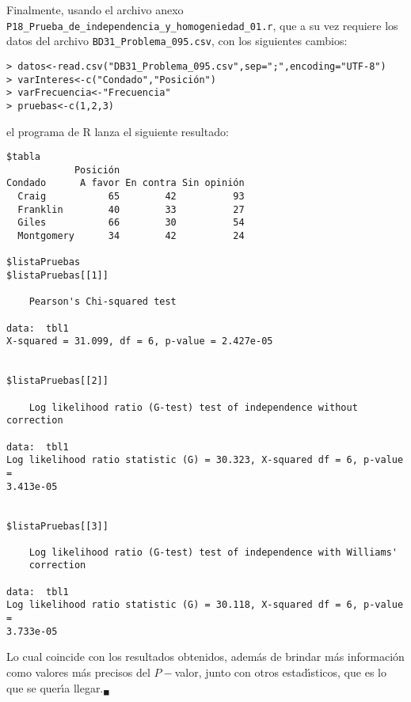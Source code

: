 \begin{solucion}
 Finalmente, usando el archivo anexo
 \texttt{P18\_Prueba\_de\_independencia\_y\_homogeniedad\_01.r},
 que a su vez requiere los datos del archivo
 \texttt{BD31\_Problema\_095.csv}, con los siguientes cambios:
 \begin{verbatim}
> datos<-read.csv("DB31_Problema_095.csv",sep=";",encoding="UTF-8")
> varInteres<-c("Condado","Posición")
> varFrecuencia<-"Frecuencia"
> pruebas<-c(1,2,3)
 \end{verbatim}
 \vspace{-0.5cm}
 el programa de R lanza el siguiente resultado:
 \begin{verbatim}
$tabla
            Posición
Condado      A favor En contra Sin opinión
  Craig           65        42          93
  Franklin        40        33          27
  Giles           66        30          54
  Montgomery      34        42          24

$listaPruebas
$listaPruebas[[1]]

	Pearson's Chi-squared test

data:  tbl1
X-squared = 31.099, df = 6, p-value = 2.427e-05


$listaPruebas[[2]]

	Log likelihood ratio (G-test) test of independence without correction

data:  tbl1
Log likelihood ratio statistic (G) = 30.323, X-squared df = 6, p-value =
3.413e-05


$listaPruebas[[3]]

	Log likelihood ratio (G-test) test of independence with Williams'
	correction

data:  tbl1
Log likelihood ratio statistic (G) = 30.118, X-squared df = 6, p-value =
3.733e-05
 \end{verbatim}
 \vspace{-0.5cm}
 Lo cual coincide con los resultados obtenidos, adem\'as de brindar m\'as
 informaci\'on como valores m\'as precisos del $P-$valor,
 junto con otros estad\'{\i}sticos,
 que es lo que se quer\'{\i}a llegar.${}_{\blacksquare}$
\end{solucion}
